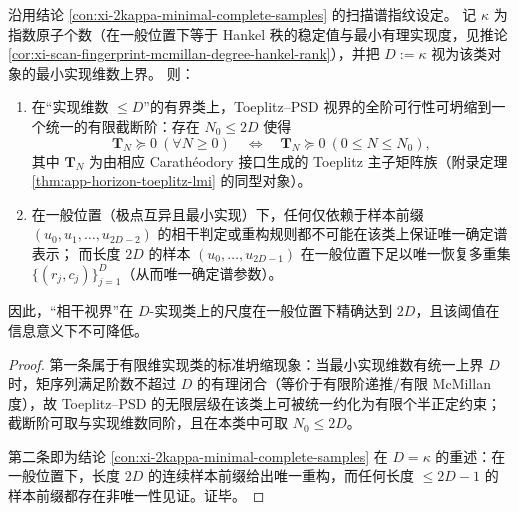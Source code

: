\begin{theorem}\label{thm:xi-toeplitz-psd-coherence-horizon-threshold}
沿用结论 \ref{con:xi-2kappa-minimal-complete-samples} 的扫描谱指纹设定。
记 \(\kappa\) 为指数原子个数（在一般位置下等于 Hankel 秩的稳定值与最小有理实现度，见推论 \ref{cor:xi-scan-fingerprint-mcmillan-degree-hankel-rank}），并把 \(D:=\kappa\) 视为该类对象的最小实现维数上界。
则：
\begin{enumerate}
  \item 在“实现维数 \(\le D\)”的有界类上，Toeplitz--PSD 视界的全阶可行性可坍缩到一个统一的有限截断阶：存在 \(N_0\le 2D\) 使得
  \[
  \mathbf{T}_N\succeq 0\ (\forall N\ge 0)
  \quad\Longleftrightarrow\quad
  \mathbf{T}_N\succeq 0\ (0\le N\le N_0),
  \]
  其中 \(\mathbf{T}_N\) 为由相应 Carath\'eodory 接口生成的 Toeplitz 主子矩阵族（附录定理 \ref{thm:app-horizon-toeplitz-lmi} 的同型对象）。
  \item 在一般位置（极点互异且最小实现）下，任何仅依赖于样本前缀
  \(
  (u_0,u_1,\dots,u_{2D-2})
  \)
  的相干判定或重构规则都不可能在该类上保证唯一确定谱表示；
  而长度 \(2D\) 的样本
  \(
  (u_0,\dots,u_{2D-1})
  \)
  在一般位置下足以唯一恢复多重集 \(\{(r_j,c_j)\}_{j=1}^{D}\)（从而唯一确定谱参数）。
\end{enumerate}
因此，“相干视界”在 \(D\)-实现类上的尺度在一般位置下精确达到 \(2D\)，且该阈值在信息意义下不可降低。
\end{theorem}

\begin{proof}
第一条属于有限维实现类的标准坍缩现象：当最小实现维数有统一上界 \(D\) 时，矩序列满足阶数不超过 \(D\) 的有理闭合（等价于有限阶递推/有限 McMillan 度），故 Toeplitz--PSD 的无限层级在该类上可被统一约化为有限个半正定约束；截断阶可取与实现维数同阶，且在本类中可取 \(N_0\le 2D\)。
\par
第二条即为结论 \ref{con:xi-2kappa-minimal-complete-samples} 在 \(D=\kappa\) 的重述：在一般位置下，长度 \(2D\) 的连续样本前缀给出唯一重构，而任何长度 \(\le 2D-1\) 的样本前缀都存在非唯一性见证。证毕。
\end{proof}

\endinput
